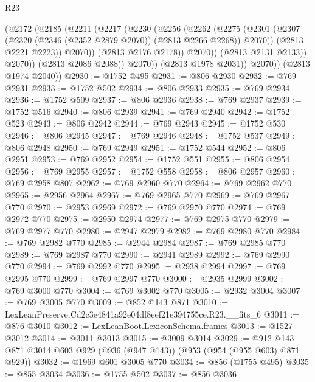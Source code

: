 \begin{lexlean}{R23}
\begin{coremodule}
                    (@2172
                      (@2185
                        (@2211
                          (@2217
                            (@2230
                              (@2256
                                (@2262
                                  (@2275
                                    (@2301
                                      (@2307
                                        (@2320 (@2346 (@2352 @2879 @2070)) (@2813 @2266 @2268))
                                        @2070))
                                    (@2813 @2221 @2223))
                                  @2070))
                              (@2813 @2176 @2178))
                            @2070))
                        (@2813 @2131 @2133))
                      @2070))
                  (@2813 @2086 @2088))
                @2070))
            (@2813 @1978 @2031))
          @2070))
      (@2813 @1974 @2040))
@2930 := @1752 @495
@2931 := @806 @2930
@2932 := @769 @2931
@2933 := @1752 @502
@2934 := @806 @2933
@2935 := @769 @2934
@2936 := @1752 @509
@2937 := @806 @2936
@2938 := @769 @2937
@2939 := @1752 @516
@2940 := @806 @2939
@2941 := @769 @2940
@2942 := @1752 @523
@2943 := @806 @2942
@2944 := @769 @2943
@2945 := @1752 @530
@2946 := @806 @2945
@2947 := @769 @2946
@2948 := @1752 @537
@2949 := @806 @2948
@2950 := @769 @2949
@2951 := @1752 @544
@2952 := @806 @2951
@2953 := @769 @2952
@2954 := @1752 @551
@2955 := @806 @2954
@2956 := @769 @2955
@2957 := @1752 @558
@2958 := @806 @2957
@2960 := @769 @2958 @807
@2962 := @769 @2960 @770
@2964 := @769 @2962 @770
@2965 := @2956 @2964
@2967 := @769 @2965 @770
@2969 := @769 @2967 @770
@2970 := @2953 @2969
@2972 := @769 @2970 @770
@2974 := @769 @2972 @770
@2975 := @2950 @2974
@2977 := @769 @2975 @770
@2979 := @769 @2977 @770
@2980 := @2947 @2979
@2982 := @769 @2980 @770
@2984 := @769 @2982 @770
@2985 := @2944 @2984
@2987 := @769 @2985 @770
@2989 := @769 @2987 @770
@2990 := @2941 @2989
@2992 := @769 @2990 @770
@2994 := @769 @2992 @770
@2995 := @2938 @2994
@2997 := @769 @2995 @770
@2999 := @769 @2997 @770
@3000 := @2935 @2999
@3002 := @769 @3000 @770
@3004 := @769 @3002 @770
@3005 := @2932 @3004
@3007 := @769 @3005 @770
@3009 := @852 @143 @871
@3010 := LexLeanPreserve.Cd2c3e4841a92e04df8eef21e394755ce.R23.__fits_6
@3011 := @876 @3010
@3012 := LexLeanBoot.LexiconSchema.frames
@3013 := @1527 @3012
@3014 := @3011 @3013
@3015 := @3009 @3014
@3029 := @912 @143 @871 @3014 @603 @929 (@936 (@947 @143)) (@953 (@954 (@955 @603) @871 @929))
@3032 := @1969 @601 @3005 @770
@3034 := @856 (@1755 @495)
@3035 := @855 @3034
@3036 := @1755 @502
@3037 := @856 @3036

\end{coremodule}
\end{lexlean}
